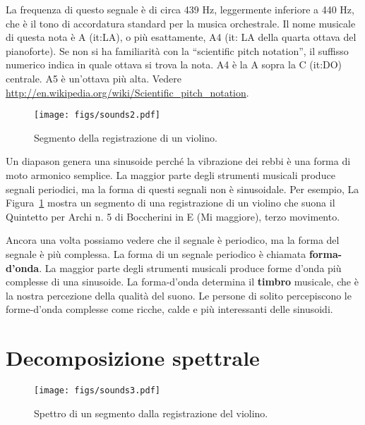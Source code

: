 \documentclass[12pt,a4paper]{book}
\begin{document}
La frequenza di questo segnale è di circa 439 Hz, leggermente inferiore a 440 Hz, che è il tono di accordatura standard per la musica orchestrale. Il nome musicale di questa nota è A (it:LA), o più esattamente, A4 (it: LA della quarta ottava del pianoforte). Se non si ha familiarità con la ``scientific pitch notation'', il suffisso numerico indica in quale ottava si trova la nota. A4 è la A sopra la C (it:DO) centrale. A5 è un'ottava più alta. Vedere \url{http://en.wikipedia.org/wiki/Scientific_pitch_notation}.

\begin{figure} 

\centerline{\texttt{[image: figs/sounds2.pdf]}} \caption{Segmento della registrazione di un violino.} \label{fig.sounds2} \end{figure} 

Un diapason genera una sinusoide perché la vibrazione dei rebbi è una forma di moto armonico semplice. La maggior parte degli strumenti musicali produce segnali periodici, ma la forma di questi segnali non è sinusoidale. Per esempio, La Figura~\ref{fig.sounds2} mostra un segmento di una registrazione di un violino che suona il Quintetto per Archi n. 5 di Boccherini in E (Mi maggiore), terzo movimento.

Ancora una volta possiamo vedere che il segnale è periodico, ma la forma del segnale è più complessa. La forma di un segnale periodico è chiamata {\bf forma-d'onda}. La maggior parte degli strumenti musicali produce forme d'onda più complesse di una sinusoide. La forma-d'onda determina il {\bf timbro} musicale, che è la nostra percezione della qualità del suono. Le persone di solito percepiscono le forme-d'onda complesse come ricche, calde e più interessanti delle sinusoidi.

\section{Decomposizione spettrale} 

\begin{figure} 

\centerline{\texttt{[image: figs/sounds3.pdf]}} \caption{Spettro di un segmento dalla registrazione del violino.} \label{fig.sounds3} \end{figure} 
\end{document}
